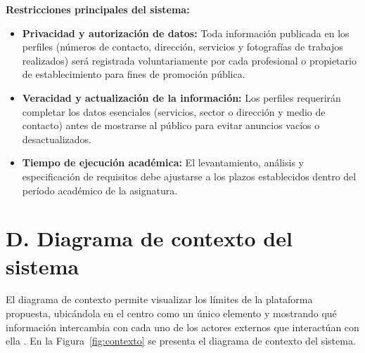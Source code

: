 \documentclass[11pt,a4paper]{article}
\begin{document}
\textbf{Restricciones principales del sistema:}
\begin{itemize}[leftmargin=1.5em, itemsep=2pt]
    \item \textbf{Privacidad y autorizaci\'on de datos:} Toda informaci\'on publicada en los perfiles (n\'umeros de contacto, direcci\'on, servicios y fotograf\'ias de trabajos realizados) ser\'a registrada voluntariamente por cada profesional o propietario de establecimiento para fines de promoci\'on p\'ublica.
    \item \textbf{Veracidad y actualizaci\'on de la informaci\'on:} Los perfiles requerir\'an completar los datos esenciales (servicios, sector o direcci\'on y medio de contacto) antes de mostrarse al p\'ublico para evitar anuncios vac\'ios o desactualizados.
    \item \textbf{Tiempo de ejecuci\'on acad\'emica:} El levantamiento, an\'alisis y especificaci\'on de requisitos debe ajustarse a los plazos establecidos dentro del per\'iodo acad\'emico de la asignatura.
\end{itemize}

\section*{D. Diagrama de contexto del sistema}

El diagrama de contexto permite visualizar los l\'imites de la plataforma propuesta, ubic\'andola en el centro como un \'unico elemento y mostrando qu\'e informaci\'on intercambia con cada uno de los actores externos que interact\'uan con ella \cite{ireb2026}. En la Figura~\ref{fig:contexto} se presenta el diagrama de contexto del sistema.
\end{document}
